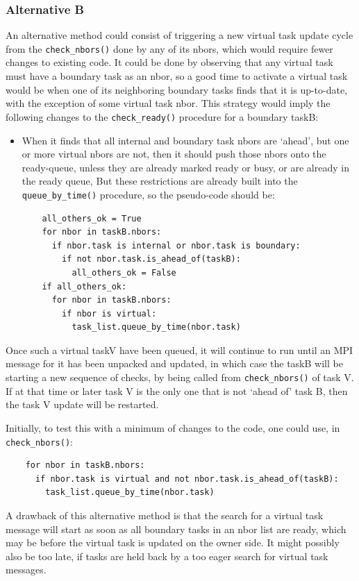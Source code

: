 \documentclass[paper=a4,fontsize=11pt]{scrartcl}
\numberwithin{equation}{section}		%
\numberwithin{figure}{section}			%
\numberwithin{table}{section}				%
\newcommand{\codecolor}{\color{Blue}}
\newcommand{\Code}[1]{{\codecolor\texttt{#1}}}
\def\checkready{\Code{check\_ready()}}
\def\checknbors{\Code{check\_nbors()}}
\def\queuebytime{\Code{queue\_by\_time()}}
\begin{document}
\subsubsection{Alternative B}
An alternative method could consist of triggering a new virtual task update cycle from the \checknbors{} done by any of its nbors, which would require fewer changes to existing code.  It could be done by observing that any virtual task must have a boundary task as an nbor, so a good time to activate a virtual task would be when one of its neighboring boundary tasks finds that it is up-to-date, with the exception of some virtual task nbor.  This strategy would imply the following changes to the \checkready{} procedure for a boundary taskB:
\begin{itemize}
    \item When it finds that all internal and boundary task nbors are `ahead', but one or more virtual nbors are not, then it should push those nbors onto the ready-queue, unless they are already marked ready or busy, or are already in the ready queue,   But these restrictions are already built into the \queuebytime{} procedure, so the pseudo-code should be:
{\codecolor\begin{verbatim}
    all_others_ok = True
    for nbor in taskB.nbors:
      if nbor.task is internal or nbor.task is boundary:
        if not nbor.task.is_ahead_of(taskB):
          all_others_ok = False
    if all_others_ok:
      for nbor in taskB.nbors:
        if nbor is virtual:
          task_list.queue_by_time(nbor.task)
\end{verbatim}}
\end{itemize}
Once such a virtual taskV have been queued, it will continue to run until an MPI message for it has been unpacked and updated, in which case the taskB will be starting a new sequence of checks, by being called from \checknbors{} of task V.  If at that time or later task V is the only one that is not `ahead of' task B, then the task V update will be restarted.

Initially, to test this with a minimum of changes to the code, one could use, in \checknbors:
{\codecolor\begin{verbatim}
    for nbor in taskB.nbors:
      if nbor.task is virtual and not nbor.task.is_ahead_of(taskB):
        task_list.queue_by_time(nbor.task)
\end{verbatim}}
A drawback of this alternative method is that the search for a virtual task message will start as soon as all boundary tasks in an nbor list are ready, which may be before the virtual task is updated on the owner side.   It might possibly also be too late, if tasks are held back by a too eager search for virtual task messages.
\end{document}
